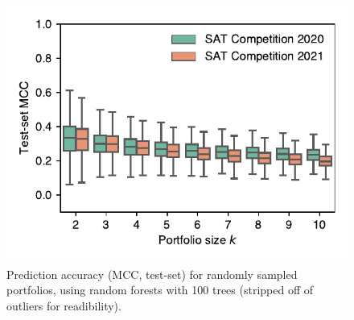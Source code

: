\documentclass[conference]{IEEEtran}
\begin{document}
\begin{figure}[t]
	\centering
	\includegraphics[width=.9\columnwidth, trim=0 15 0 10, clip]{plots/prediction-test-mcc.pdf}
	\caption{
		Prediction accuracy (MCC, test-set) for randomly sampled portfolios, using random forests with 100 trees (stripped off of outliers for readibility).
	}
	\label{fig:prediction-test-mcc}
\end{figure}
\end{document}
